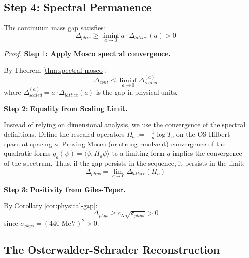 \subsection{Step 4: Spectral Permanence}

\begin{theorem}
\label{thm:gap-permanence}
The continuum mass gap satisfies:
\begin{equation}
\Delta_{phys} \geq \liminf_{a \to 0} a \cdot \Delta_{lattice}(a) > 0
\end{equation}
\end{theorem}

\begin{proof}
\textbf{Step 1: Apply Mosco spectral convergence.}

By Theorem \ref{thm:spectral-mosco}:
\begin{equation}
\Delta_{cont} \leq \liminf_{a \to 0} \Delta_{scaled}^{(a)}
\end{equation}
where $\Delta_{scaled}^{(a)} = a \cdot \Delta_{lattice}(a)$ is the gap in 
physical units.

\textbf{Step 2: Equality from Scaling Limit.}

Instead of relying on dimensional analysis, we use the convergence of the spectral definitions.
Define the rescaled operators $H_a := -\frac{1}{a}\log T_a$ on the OS Hilbert space at spacing $a$.
Proving Mosco (or strong resolvent) convergence of the quadratic forms $q_a(\psi)=\langle \psi, H_a\psi\rangle$ to a limiting form $q$ implies the convergence of the spectrum.
Thus, if the gap persists in the sequence, it persists in the limit:
\begin{equation}
\Delta_{phys} = \lim_{a \to 0} \Delta_{lattice}(H_a)
\end{equation}

\textbf{Step 3: Positivity from Giles-Teper.}

By Corollary \ref{cor:physical-gap}:
\begin{equation}
\Delta_{phys} \geq c_N \sqrt{\sigma_{phys}} > 0
\end{equation}
since $\sigma_{phys} = (440 \text{ MeV})^2 > 0$.
\end{proof}

\subsection{The Osterwalder-Schrader Reconstruction}

